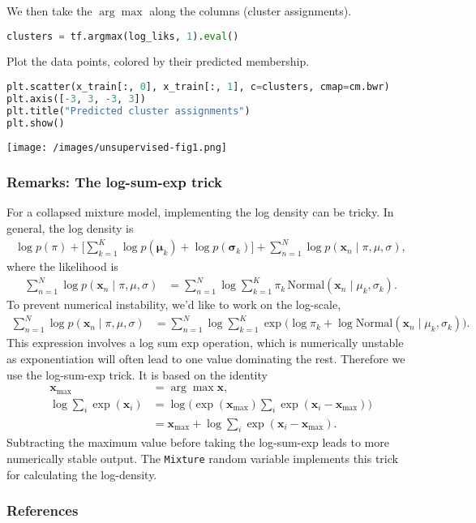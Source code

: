 We then take the $\arg\max$ along the columns (cluster assignments).
\begin{lstlisting}[language=Python]
clusters = tf.argmax(log_liks, 1).eval()
\end{lstlisting}

Plot the data points, colored by their predicted membership.
\begin{lstlisting}[language=Python]
plt.scatter(x_train[:, 0], x_train[:, 1], c=clusters, cmap=cm.bwr)
plt.axis([-3, 3, -3, 3])
plt.title("Predicted cluster assignments")
plt.show()
\end{lstlisting}

\texttt{[image: /images/unsupervised-fig1.png]}

\subsubsection{Remarks: The log-sum-exp trick}

For a collapsed mixture model, implementing the log density can be tricky.
In general, the log density is
\begin{align*}
  \log p(\pi) +
  \Big[ \sum_{k=1}^K \log p(\mathbf{\mu}_k) + \log
  p(\mathbf{\sigma}_k) \Big] +
  \sum_{n=1}^N \log p(\mathbf{x}_n \mid \pi, \mu, \sigma),
\end{align*}
where the likelihood is
\begin{align*}
  \sum_{n=1}^N \log p(\mathbf{x}_n \mid \pi, \mu, \sigma)
  &=
  \sum_{n=1}^N \log \sum_{k=1}^K \pi_k \, \text{Normal}(\mathbf{x}_n \mid
  \mu_k, \sigma_k).
\end{align*}
To prevent numerical instability, we'd like to work on the log-scale,
\begin{align*}
  \sum_{n=1}^N \log p(\mathbf{x}_n \mid \pi, \mu, \sigma)
  &=
  \sum_{n=1}^N \log \sum_{k=1}^K \exp\Big(
  \log \pi_k + \log \text{Normal}(\mathbf{x}_n \mid \mu_k, \sigma_k)\Big).
\end{align*}
This expression involves a log sum exp operation, which is
numerically unstable as exponentiation will often lead to one value
dominating the rest. Therefore we use the log-sum-exp trick.
It is based on the identity
\begin{align*}
  \mathbf{x}_{\mathrm{max}}
  &=
  \arg\max \mathbf{x},
  \\
  \log \sum_i \exp(\mathbf{x}_i)
  &=
  \log \Big(\exp(\mathbf{x}_{\mathrm{max}}) \sum_i \exp(\mathbf{x}_i -
  \mathbf{x}_{\mathrm{max}})\Big)
  \\
  &=
  \mathbf{x}_{\mathrm{max}} + \log \sum_i \exp(\mathbf{x}_i -
  \mathbf{x}_{\mathrm{max}}).
\end{align*}
Subtracting the maximum value before taking the log-sum-exp leads to
more numerically stable output. The \texttt{Mixture} random variable
implements this trick for calculating the log-density.

\subsubsection{References}\label{references}
